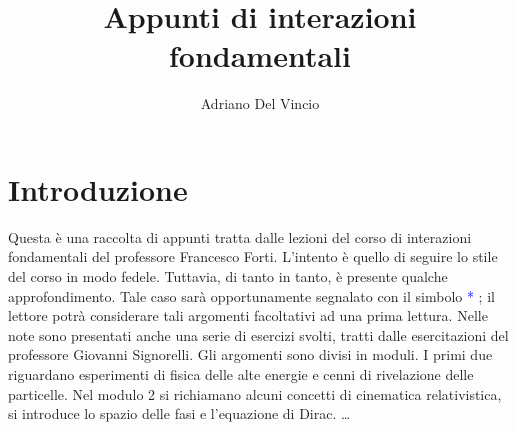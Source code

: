 \documentclass[12pt,a4paper,twoside]{book}
\title{Appunti di interazioni fondamentali}
\author{Adriano Del Vincio}
\begin{document}
\maketitle

\section{Introduzione}
Questa è una raccolta di appunti tratta dalle lezioni del corso di interazioni fondamentali del professore Francesco Forti. 
L'intento è quello di seguire lo stile del corso in modo fedele. Tuttavia, di tanto in tanto, è presente qualche approfondimento. Tale caso sarà opportunamente segnalato con il simbolo \textcolor{blue}{*} ; il lettore potrà considerare tali argomenti facoltativi ad una prima lettura.
Nelle note sono presentati anche una serie di esercizi svolti, tratti dalle esercitazioni del professore Giovanni Signorelli. 
Gli argomenti sono divisi in moduli. I primi due riguardano esperimenti di fisica delle alte energie e cenni di rivelazione delle particelle. Nel modulo 2 si richiamano alcuni concetti di cinematica relativistica, si introduce lo spazio delle fasi e l'equazione di Dirac. \dots

\frontmatter
\tableofcontents 


\end{document}
